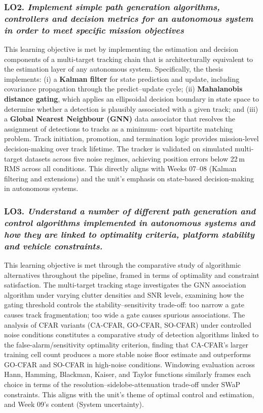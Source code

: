 \subsubsection*{LO2. \emph{Implement simple path generation algorithms, controllers and
decision metrics for an autonomous system in order to meet specific mission objectives}}
This learning objective is met by implementing the estimation and decision components of
a multi-target tracking chain that is architecturally equivalent to the estimation layer
of any autonomous system. Specifically, the thesis implements: (i) a
\textbf{Kalman filter} for state prediction and update, including covariance propagation
through the predict--update cycle; (ii) \textbf{Mahalanobis distance gating}, which
applies an ellipsoidal decision boundary in state space to determine whether a detection
is plausibly associated with a given track; and (iii) a \textbf{Global Nearest Neighbour
(GNN)} data associator that resolves the assignment of detections to tracks as a minimum-
cost bipartite matching problem. Track initiation, promotion, and termination logic
provides mission-level decision-making over track lifetime. The tracker is validated on
simulated multi-target datasets across five noise regimes, achieving position errors
below 22\,m RMS across all conditions. This directly aligns with Weeks 07--08 (Kalman
filtering and extensions) and the unit's emphasis on state-based decision-making in
autonomous systems.

\subsubsection*{LO3. \emph{Understand a number of different path generation and control
algorithms implemented in autonomous systems and how they are linked to optimality
criteria, platform stability and vehicle constraints.}}
This learning objective is met through the comparative study of algorithmic alternatives
throughout the pipeline, framed in terms of optimality and constraint satisfaction.
The multi-target tracking stage investigates the GNN association algorithm under
varying clutter densities and SNR levels, examining how the gating threshold controls
the stability--sensitivity trade-off: too narrow a gate causes track fragmentation;
too wide a gate causes spurious associations. The analysis of CFAR variants
(CA-CFAR, GO-CFAR, SO-CFAR) under controlled noise conditions constitutes a
comparative study of detection algorithms linked to the false-alarm/sensitivity
optimality criterion, finding that CA-CFAR's larger training cell count produces
a more stable noise floor estimate and outperforms GO-CFAR and SO-CFAR in high-noise
conditions. Windowing evaluation across Hann, Hamming, Blackman, Kaiser, and Taylor
functions similarly frames each choice in terms of the resolution--sidelobe-attenuation
trade-off under SWaP constraints. This aligns with the unit's theme of optimal 
control and estimation, and Week 09's content (System uncertainty).


